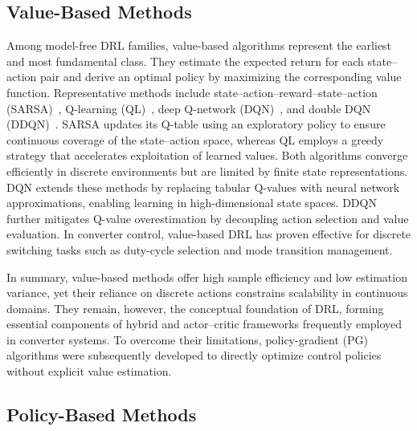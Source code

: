 \subsection{Value-Based Methods}
\label{sec:value_methods}

Among model-free DRL families, value-based algorithms represent the earliest and most fundamental class. 
They estimate the expected return for each state–action pair and derive an optimal policy by maximizing the corresponding value function. 
Representative methods include state–action–reward–state–action (SARSA)~\cite{rummery1994line}, Q-learning (QL)~\cite{watkins1992q}, deep Q-network (DQN)~\cite{van2016deep}, and double DQN (DDQN)~\cite{wang2016dueling}. 
SARSA updates its Q-table using an exploratory policy to ensure continuous coverage of the state–action space, whereas QL employs a greedy strategy that accelerates exploitation of learned values. 
Both algorithms converge efficiently in discrete environments but are limited by finite state representations. 
DQN extends these methods by replacing tabular Q-values with neural network approximations, enabling learning in high-dimensional state spaces. 
DDQN further mitigates Q-value overestimation by decoupling action selection and value evaluation. 
In converter control, value-based DRL has proven effective for discrete switching tasks such as duty-cycle selection and mode transition management.

In summary, value-based methods offer high sample efficiency and low estimation variance, yet their reliance on discrete actions constrains scalability in continuous domains. 
They remain, however, the conceptual foundation of DRL, forming essential components of hybrid and actor–critic frameworks frequently employed in converter systems. 
To overcome their limitations, policy-gradient (PG) algorithms were subsequently developed to directly optimize control policies without explicit value estimation.

\subsection{Policy-Based Methods}
\label{sec:policy_methods}

